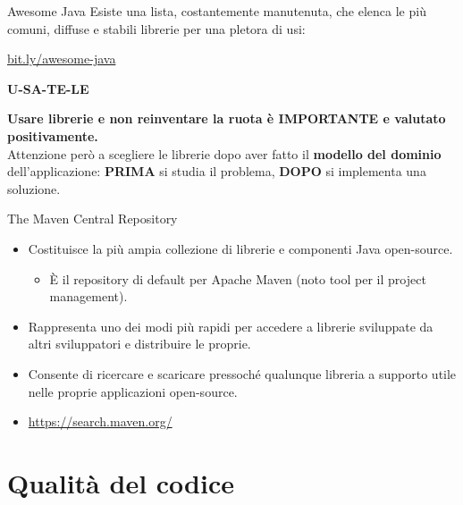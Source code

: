 \documentclass[presentation]{beamer}
\begin{document}
\begin{frame}{Awesome Java}
	Esiste una lista, costantemente manutenuta, che elenca le più comuni, diffuse e stabili librerie per una pletora di usi:
	\begin{center}
		\url{bit.ly/awesome-java}
	\end{center}
	\begin{center}
		\begin{LARGE}\textbf{U-SA-TE-LE}\end{LARGE}
	\end{center}
	\begin{center}
		\textbf{Usare librerie e non reinventare la ruota è \alert{IMPORTANTE} e valutato positivamente.}\\
		Attenzione però a scegliere le librerie dopo aver fatto il \textbf{modello del dominio} dell'applicazione: \textbf{PRIMA} si studia il problema, \textbf{DOPO} si implementa una soluzione.
	\end{center}
\end{frame}

\begin{frame}{The Maven Central Repository}
\begin{itemize}\itemsep10pt
\item Costituisce la più ampia collezione di librerie e componenti Java open-source.
\begin{itemize}
\item È il repository di default per Apache Maven (noto tool per il project management).
\end{itemize}
\item Rappresenta uno dei modi più rapidi per accedere a librerie sviluppate da altri sviluppatori e distribuire le proprie.
\item Consente di ricercare e scaricare pressoché qualunque libreria a supporto utile nelle proprie applicazioni open-source.

\item \url{https://search.maven.org/}
\end{itemize}
\end{frame}

\section{Qualità  del codice}
\end{document}
